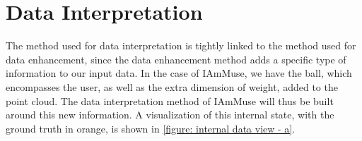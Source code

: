 \section{Data Interpretation}
\label{section: tracking method - data interpretation}


The method used for data interpretation is tightly linked to the method used for data enhancement, since the data enhancement method adds a specific type of information to our input data.
In the case of IAmMuse, we have the ball, which encompasses the user, as well as the extra dimension of weight, added to the point cloud.
The data interpretation method of IAmMuse will thus be built around this new information.
A visualization of this internal state, with the ground truth in orange, is shown in \cref{figure: internal data view - a}.


